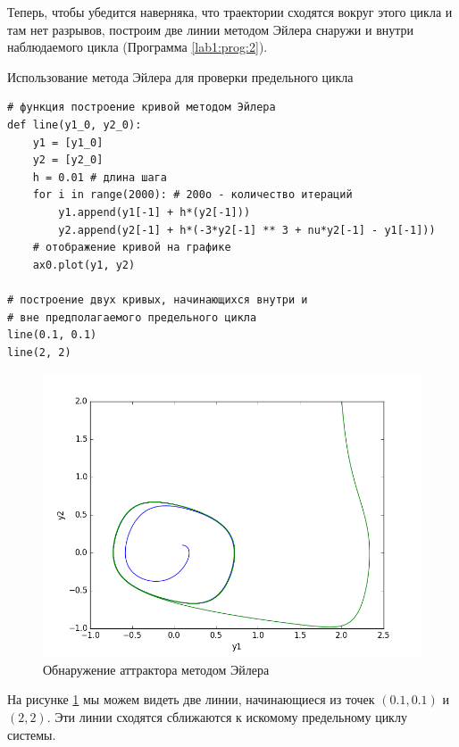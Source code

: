 Теперь, чтобы убедится наверняка, что траектории сходятся вокруг этого цикла
и там нет разрывов, построим две линии методом Эйлера снаружи и внутри наблюдаемого
цикла (Программа \ref{lab1:prog:2}).

\begin{program}
  \caption{Использование метода Эйлера для проверки предельного цикла}
  \label{lab1:prog:2}
  \begin{verbatim}
# функция построение кривой методом Эйлера
def line(y1_0, y2_0):
    y1 = [y1_0]
    y2 = [y2_0]
    h = 0.01 # длина шага
    for i in range(2000): # 200o - количество итераций
        y1.append(y1[-1] + h*(y2[-1]))
        y2.append(y2[-1] + h*(-3*y2[-1] ** 3 + nu*y2[-1] - y1[-1]))
    # отображение кривой на графике
    ax0.plot(y1, y2)

# построение двух кривых, начинающихся внутри и
# вне предполагаемого предельного цикла
line(0.1, 0.1)
line(2, 2)
  \end{verbatim}
\end{program}

\clearpage

\begin{figure}[thp]
  \centering
  \includegraphics[width=\textwidth]{figures/1_cycle}
  \caption{Обнаружение аттрактора методом Эйлера}
  \label{lab1:cycle}
\end{figure}

На рисунке \ref{lab1:cycle} мы можем видеть две линии, начинающиеся из точек
$(0.1, 0.1)$ и $(2, 2)$. Эти линии сходятся сближаются к искомому предельному
циклу системы.
